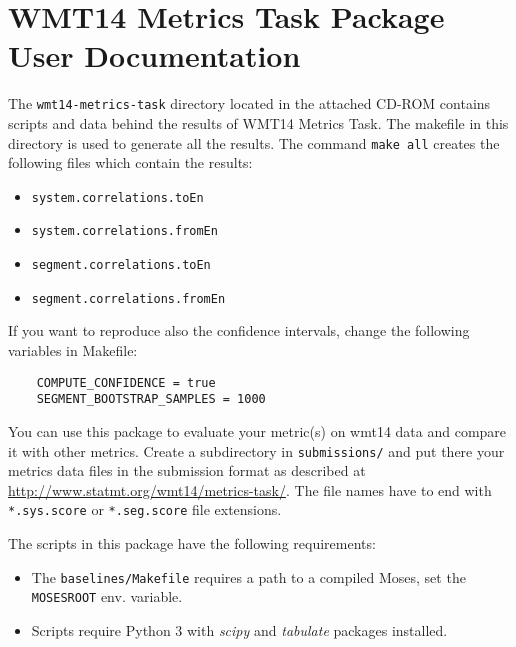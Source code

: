 \appendix
\chapter{WMT14 Metrics Task Package User Documentation}
\label{metrics-documentation}

\noindent
The \texttt{wmt14-metrics-task} directory located in the attached CD-ROM
contains scripts and data behind the results of WMT14 Metrics Task. The
makefile in this directory is used to generate all the results. The command
\texttt{make all} creates the following files which contain the results: 

\begin{itemize}
  \item \texttt{system.correlations.toEn}
  \item \texttt{system.correlations.fromEn}
  \item \texttt{segment.correlations.toEn}
  \item \texttt{segment.correlations.fromEn}
\end{itemize}

\noindent
If you want to reproduce also the confidence intervals, change the following
variables in Makefile:

\begin{verbatim}
    COMPUTE_CONFIDENCE = true
    SEGMENT_BOOTSTRAP_SAMPLES = 1000
\end{verbatim}

\noindent
You can use this package to evaluate your metric(s) on wmt14 data and compare
it with other metrics. Create a subdirectory in \texttt{submissions/} and put
there your metrics data files in the submission format as described at
\url{http://www.statmt.org/wmt14/metrics-task/}.  The file names have to end
with \texttt{*.sys.score} or \texttt{*.seg.score} file extensions.

\vspace{0.7cm}
\noindent
The scripts in this package have the following requirements:
 
\begin{itemize}
  \item The \texttt{baselines/Makefile} requires a path to a compiled Moses, set
    the \texttt{MOSESROOT} env. variable.
  \item Scripts require Python 3 with \textit{scipy} and \textit{tabulate} packages installed.
\end{itemize}


